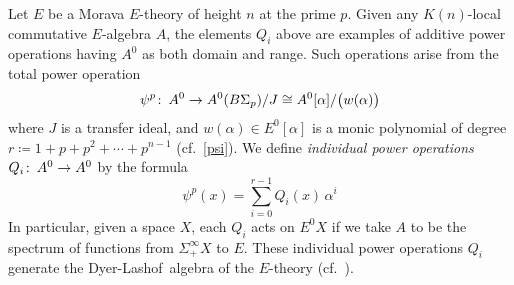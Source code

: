 \documentclass{gtpart}
\theoremstyle{definition}
\theoremstyle{remark}
\def\co{\colon\thinspace}
\newcommand{\DL}{Dyer-Lashof~}
\newcommand{\A}{\alpha}
\newcommand{\ce}{\coloneqq}
\renewcommand{\=}{\approx}
\renewcommand{\-}{\sim}
\numberwithin{equation}{section}
\begin{document}
Let $E$ be a Morava $E$-theory of height $n$ at the prime $p$.  Given any 
$K(n)$-local commutative $E$-algebra $A$, the elements $Q_i$ above are examples 
of additive power operations having $A^0$ as both domain and range.  Such 
operations arise from the total power operation 
\begin{equation}
 \label{totalpo}
 \psi^p \co A^0 \to A^0(B\Sigma_p) / J \cong A^0[\A] / \big( w(\A) \big) 
\end{equation}
where $J$ is a transfer ideal, and $w(\A) \in E^0[\A]$ is a monic polynomial of 
degree $r \ce 1 + p + p^2 + \cdots + p^{n - 1}$ (cf.~\eqref{psi}).  We define 
{\em individual power operations} $Q_i \co A^0 \to A^0$ by the formula 
\begin{equation}
 \label{Q}
 \psi^p(x) = \sum_{i = 0}^{r - 1} Q_i(x) \, \A^i 
\end{equation}
In particular, given a space $X$, each $Q_i$ acts on $E^0 X$ if we take $A$ to 
be the spectrum of functions from $\Sigma_+^\infty X$ to $E$.  These individual 
power operations $Q_i$ generate the \DL algebra of the $E$-theory 
(cf.~\cite[proof of Theorem 3.10]{p3}).  
\end{document}
